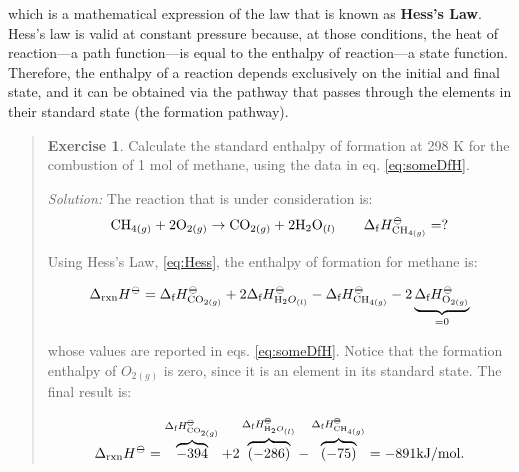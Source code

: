 \documentclass[
  9pt,
]{extbook}
\theoremstyle{definition}
\theoremstyle{definition}
\theoremstyle{definition}
\newtheorem{exercise}{Exercise}[chapter]
\theoremstyle{definition}
\theoremstyle{remark}
\begin{document}
which is a mathematical expression of the law that is known as \textbf{Hess's Law}. Hess's law is valid at constant pressure because, at those conditions, the heat of reaction---a path function---is equal to the enthalpy of reaction---a state function. Therefore, the enthalpy of a reaction depends exclusively on the initial and final state, and it can be obtained via the pathway that passes through the elements in their standard state (the formation pathway).

\begin{quote}
\begin{exercise}
\protect\hypertarget{exr:HessLawEx}{}\label{exr:HessLawEx}Calculate the standard enthalpy of formation at 298 K for the combustion of 1 mol of methane, using the data in eq. \eqref{eq:someDfH}.

\emph{Solution:} The reaction that is under consideration is:
\begin{equation}
  \mathrm{CH}_{4(g)} + 2 \mathrm{O}_{2(g)} \rightarrow \mathrm{CO}_{2(g)} + 2 \mathrm{H}_2 \mathrm{O}_{(l)} \qquad \Delta_{\mathrm{f}} H_{\mathrm{CH}_{4(g)}}^{-\kern-6pt{\ominus}\kern-6pt-}= ?
\end{equation}

Using Hess's Law, \eqref{eq:Hess}, the enthalpy of formation for methane is:

\begin{equation}
 \Delta_{\text{rxn}} H^{-\kern-6pt{\ominus}\kern-6pt-}=  \Delta_{\text{f}} H^{-\kern-6pt{\ominus}\kern-6pt-}_{\mathrm{CO}_{2(g)}} + 2 \Delta_{\text{f}} H^{-\kern-6pt{\ominus}\kern-6pt-}_{\mathrm{H}_{2}O_{(l)}} - \Delta_{\text{f}} H^{-\kern-6pt{\ominus}\kern-6pt-}_{\mathrm{CH}_{4(g)}} - 2 \underbrace{\Delta_{\text{f}} H^{-\kern-6pt{\ominus}\kern-6pt-}_{\mathrm{O}_{2(g)}}}_{=0}
\end{equation}

whose values are reported in eqs. \eqref{eq:someDfH}. Notice that the formation enthalpy of \(O_{2(g)}\) is zero, since it is an element in its standard state. The final result is:

\begin{equation}
 \Delta_{\text{rxn}} H^{-\kern-6pt{\ominus}\kern-6pt-}=  \overbrace{-394}^{\Delta_{\text{f}} H^{-\kern-6pt{\ominus}\kern-6pt-}_{\mathrm{CO}_{2(g)}}} +2 \overbrace{(-286)}^{\Delta_{\text{f}} H^{-\kern-6pt{\ominus}\kern-6pt-}_{\mathrm{H}_{2}O_{(l)}}} - \overbrace{(-75)}^{\Delta_{\text{f}} H^{-\kern-6pt{\ominus}\kern-6pt-}_{\mathrm{CH}_{4(g)}}}  = -891 \mathrm{kJ/mol}.
\end{equation}


\end{exercise}
\end{quote}
\end{document}
